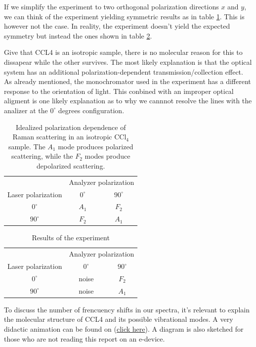 \documentclass[11pt,a4paper]{article}
\begin{document}
If we simplify the experiment to two orthogonal polarization directions $x$ and $y$, we can think of the experiment yielding symmetric results as in table \ref{tab:ccl4_polarization}. This is however not the case. In reality, the experiment doesn't yield the expected symmetry but instead the ones shown in table \ref{tab:ccl4_polarization_real}.

Give that CCL4 is an isotropic sample, there is no molecular reason for this to dissapear while the other survives. The most likely explanation is that the optical system has an additional polarization-dependent transmission/collection effect. As already mentioned, the monochromator used in the experiment has a different response to the orientation of light. This conbined with an improper optical aligment is one likely explanation as to why we cannnot resolve the lines with the analizer at the $0^{\circ}$ degrees configuration.
\begin{table}[H]
    \centering
    \caption{Idealized polarization dependence of Raman scattering in an isotropic
    $\mathrm{CCl_4}$ sample. The $A_1$ mode produces polarized scattering,
    while the $F_2$ modes produce depolarized scattering.}
    \label{tab:ccl4_polarization}
    \begin{tabular}{c|cc}
        & \multicolumn{2}{c}{Analyzer polarization} \\
        Laser polarization & $0^\circ$ & $90^\circ$ \\
        \hline
        $0^\circ$  & $A_1$ & $F_2$ \\
        $90^\circ$ & $F_2$ & $A_1$ \\
    \end{tabular}
\end{table}

\begin{table}[H]
    \centering
    \caption{Results of the experiment}
    \label{tab:ccl4_polarization_real}
    \begin{tabular}{c|cc}
        & \multicolumn{2}{c}{Analyzer polarization} \\
        Laser polarization & $0^\circ$ & $90^\circ$ \\
        \hline
        $0^\circ$  & noise & $F_2$ \\
        $90^\circ$ & noise & $A_1$ \\
    \end{tabular}
\end{table}
To discuss the number of frencuency shifts in our spectra, it's relevant to explain the molecular structure of CCL4 and its possible vibrational modes. A very didactic animation can be found on \cite{chalmers}(\href{https://fy.chalmers.se/OLDUSERS/brodin/MolecularMotions/CCl4modes.html}{click here}). A diagram is also sketched for those who are not reading this report on an e-device.
\end{document}
